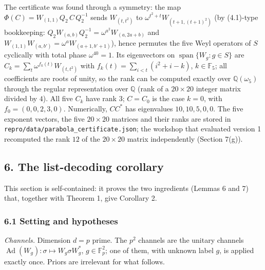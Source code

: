 \documentclass[
  11pt,
  a4paper,
]{article}
\begin{document}
The certificate was found through a symmetry: the map
\(\Phi(C)=W_{(1,\allowbreak{}1)}Q_2\,\allowbreak{}C\,\allowbreak{}Q_2^{-1}\) sends \(W_{(t,\allowbreak{}t^2)}\) to
\(\omega^{t^2+t}W_{(t+1,\allowbreak{}(t+1)^2)}\) (by (4.1)-type bookkeeping:
\(Q_2W_{(a,\allowbreak{}b)}Q_2^{-1}=\omega^{a^2}W_{(a,\allowbreak{}2a+b)}\) and
\(W_{(1,\allowbreak{}1)}W_{(a,\allowbreak{}b')}=\omega^aW_{(a+1,\allowbreak{}b'+1)}\)), hence permutes the five
Weyl operators of \(S\) cyclically with total phase \(\omega^{40}=1\).
Its eigenvectors on \(\operatorname{span}\{W_g:g\in S\}\) are
\(C_k=\sum_t\omega^{f_k(t)}W_{(t,\allowbreak{}t^2)}\) with
\(f_k(t)=\sum_{i<t}(i^2+i-k)\), \(k\in\mathbb F_5\); all coefficients
are roots of unity, so the rank can be computed exactly over
\(\mathbb Q(\omega_5)\) through the regular representation over
\(\mathbb Q\) (rank of a \(20\times20\) integer matrix divided by
\(4\)). All five \(C_k\) have rank \(3\); \(C=C_0\) is the case \(k=0\),
with \(f_0=(0,\allowbreak{}0,\allowbreak{}2,\allowbreak{}3,\allowbreak{}0)\). Numerically, \(CC^*\) has eigenvalues
\(10,\allowbreak{}10,\allowbreak{}5,\allowbreak{}0,\allowbreak{}0\). The five exponent vectors, the five \(20\times20\)
matrices and their ranks are stored in
{\small\texttt{repro/\allowbreak{}data/\allowbreak{}parabola\_\allowbreak{}certificate.\allowbreak{}json}}; the workshop that
evaluated version 1 recomputed the rank \(12\) of the \(20\times20\)
matrix independently (Section 7(g)).

\subsection{6. The list-decoding
corollary}\label{the-list-decoding-corollary}

This section is self-contained: it proves the two ingredients (Lemmas 6
and 7) that, together with Theorem 1, give Corollary 2.

\subsubsection{6.1 Setting and hypotheses}\label{setting-and-hypotheses}

\emph{Channels.} Dimension \(d=p\) prime. The \(p^2\) channels are the
unitary channels
\(\operatorname{Ad}(W_g):\sigma\mapsto W_g\sigma W_g^*\),
\(g\in\mathbb F_p^2\); one of them, with unknown label \(g\), is applied
exactly once. Priors are irrelevant for what follows.
\end{document}
